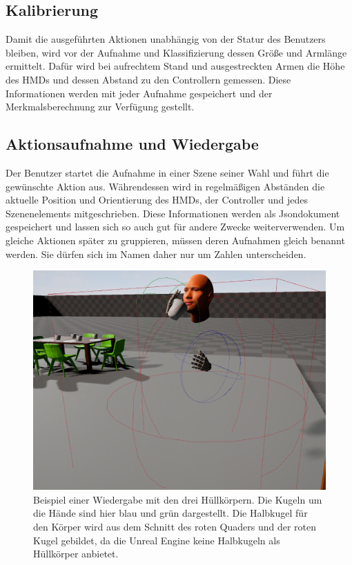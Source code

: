 \subsection{Kalibrierung}
Damit die ausgeführten Aktionen unabhängig von der Statur des Benutzers bleiben, wird vor der Aufnahme und Klassifizierung dessen Größe und Armlänge ermittelt. Dafür wird bei aufrechtem Stand und ausgestreckten Armen die Höhe des HMDs und dessen Abstand zu den Controllern gemessen. Diese Informationen werden mit jeder Aufnahme gespeichert und der Merkmalsberechnung zur Verfügung gestellt.

\subsection{Aktionsaufnahme und Wiedergabe}
\label{subsec:aktionsaufnahme-und-wiedergabe}
Der Benutzer startet die Aufnahme in einer Szene seiner Wahl und führt die gewünschte Aktion aus. Währendessen wird in regelmäßigen Abständen die aktuelle Position und Orientierung des HMDs, der Controller und jedes Szenenelements mitgeschrieben. Diese Informationen werden als Jsondokument gespeichert und lassen sich so auch gut für andere Zwecke weiterverwenden. Um gleiche Aktionen später zu gruppieren, müssen deren Aufnahmen gleich benannt werden. Sie dürfen sich im Namen daher nur um Zahlen unterscheiden.\newline
\begin{figure}[hbtp]
\includegraphics[width=1.0\linewidth]{PlaybackActor.png}
\caption{Beispiel einer Wiedergabe mit den drei Hüllkörpern. Die Kugeln um die Hände sind hier blau und grün dargestellt. Die Halbkugel für den Körper wird aus dem Schnitt des roten Quaders und der roten Kugel gebildet, da die Unreal Engine keine Halbkugeln als Hüllkörper anbietet.}
\label{fig:playback-actor}
\end{figure}
